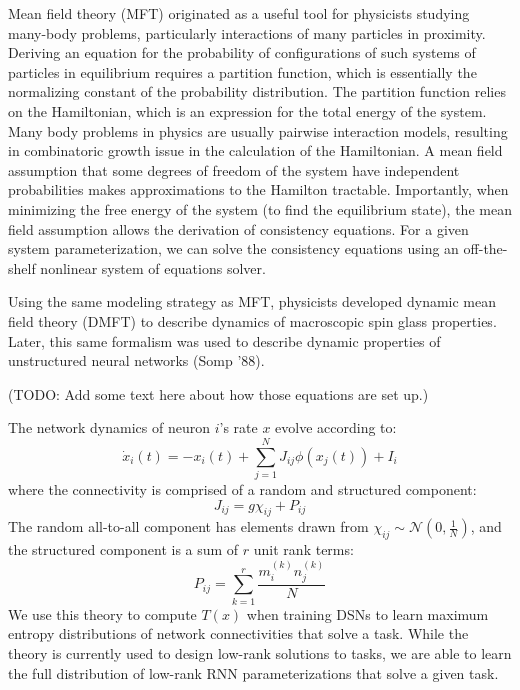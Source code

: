 \documentclass[11pt]{article}
\begin{document}
Mean field theory (MFT) originated as a useful tool for physicists studying many-body problems, particularly interactions of many particles in proximity.  Deriving an equation for the probability of configurations of such systems of particles in equilibrium requires a partition function, which is essentially the normalizing constant of the probability distribution.  The partition function relies on the Hamiltonian, which is an expression for the total energy of the system.  Many body problems in physics are usually pairwise interaction models, resulting in  combinatoric growth issue in the calculation of the Hamiltonian.  A mean field assumption that some degrees of freedom of the system have independent probabilities makes approximations to the Hamilton tractable.  Importantly, when minimizing the free energy of the system (to find the equilibrium state), the mean field assumption allows the derivation of consistency equations.  For a given system parameterization, we can solve the consistency equations using an off-the-shelf nonlinear system of equations solver.

Using the same modeling strategy as MFT, physicists developed dynamic mean field theory (DMFT) to describe dynamics of macroscopic spin glass properties. Later, this same formalism was used to describe dynamic properties of unstructured neural networks (Somp ’88).

(TODO: Add some text here about how those equations are set up.)

The network dynamics of neuron $i$'s rate $x$ evolve according to:
\begin{equation}
\dot{x}_i(t) = -x_i(t) + \sum_{j=1}^N J_{ij} \phi(x_j(t)) + I_i 
\end{equation}
where the connectivity is comprised of a random and structured component:
\begin{equation}
J_{ij} = g \chi_{ij} + P_{ij}
\end{equation}
The random all-to-all component has elements drawn from
$\chi_{ij} \sim \mathcal{N}(0, \frac{1}{N})$, and the structured
component is a sum of $r$ unit rank terms:
\begin{equation}
P_{ij} = \sum_{k=1}^r \frac{m_i^{(k)}n_j^{(k)}}{N}
\end{equation}
We use this theory to compute $T(x)$ when training DSNs to learn maximum entropy distributions of network connectivities that solve a task.  While the theory is currently used to design low-rank solutions to tasks, we are able to learn the full distribution of low-rank RNN parameterizations that solve a given task.
\end{document}
